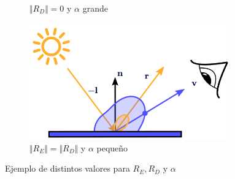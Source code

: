 \begin{figure}[!h]
\begin{subfigure}[b]{0.45\linewidth}
        \caption{$\Vert R_D\Vert = 0$ y $\alpha$ grande}
     \end{subfigure}
     \hfill
     \begin{subfigure}[b]{0.45\linewidth}
        \centering
        \includegraphics[width=0.95\textwidth]{Plantilla-TFG-master/img/ks1kd1a0.png}
        \caption{$\Vert R_E\Vert =\Vert R_D\Vert$ y $\alpha$ pequeño}
     \end{subfigure}
     \caption{Ejemplo de distintos valores para $R_E,R_D$ y $\alpha$}
     \label{fig:parametrosEspecular}
\end{figure}

